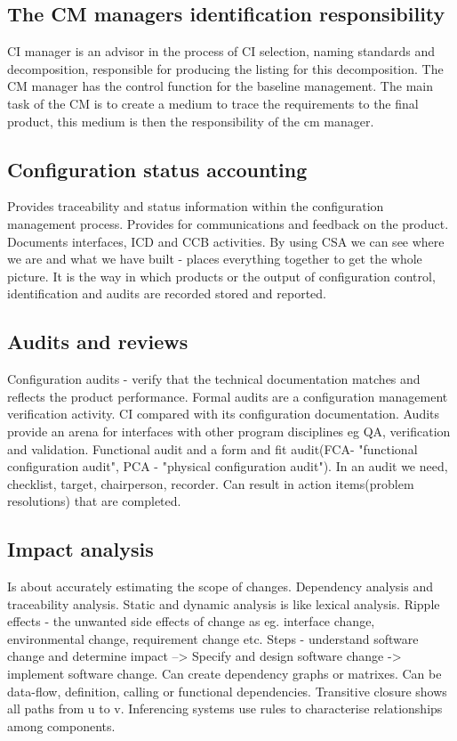 \subsection{The CM managers identification responsibility}
CI manager is an advisor in the process of CI selection, naming standards  and decomposition, responsible for producing the listing for this decomposition. The CM manager has the control
function for the baseline management. The main task of the CM is to create a medium to trace the requirements to the final product, this medium is then the responsibility of the cm manager.

\subsection{ Configuration status accounting}
Provides traceability and status information within the configuration management process. Provides for communications and feedback on the product. Documents interfaces, ICD and CCB activities.
By using CSA we can see where we are and what we have built - places everything together to get the whole picture. It is the way in which products or the output of configuration control, identification and audits
are recorded stored and reported.
\subsection{Audits and reviews}
Configuration audits - verify that the technical documentation matches and reflects the product performance.
Formal audits are a configuration management verification activity. CI compared with its configuration documentation.
Audits provide an arena for interfaces with other program disciplines eg QA, verification and validation.
Functional audit and a form and fit audit(FCA- "functional configuration audit", PCA - "physical configuration audit").
In an audit we need, checklist, target, chairperson, recorder. Can result in action items(problem resolutions) that are completed.

\subsection{Impact analysis}
Is about accurately estimating the scope of changes. Dependency analysis and traceability analysis. Static and dynamic analysis is like lexical analysis.
Ripple effects - the unwanted side effects of change as eg. interface change, environmental change, requirement change etc.
Steps - understand software change and determine impact --> Specify and design software change -> implement software change.
Can create dependency graphs or matrixes. Can be data-flow, definition, calling or functional dependencies.
Transitive closure shows all paths from u to v. Inferencing systems use rules to characterise relationships among components.


